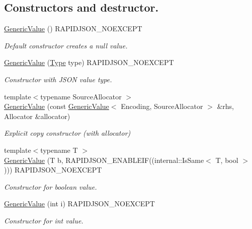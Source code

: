 \subsection*{Constructors and destructor.}
\begin{DoxyCompactItemize}
\item 
\hyperlink{classGenericValue_ab0205d57176d83814ea4e4598c596fe8}{Generic\+Value} () R\+A\+P\+I\+D\+J\+S\+O\+N\+\_\+\+N\+O\+E\+X\+C\+E\+PT
\begin{DoxyCompactList}\small\item\em Default constructor creates a null value. \end{DoxyCompactList}\item 
\hyperlink{classGenericValue_a83c8f84b8e61f2f40414b703b75aea61}{Generic\+Value} (\hyperlink{rapidjson_8h_a1d1cfd8ffb84e947f82999c682b666a7}{Type} type) R\+A\+P\+I\+D\+J\+S\+O\+N\+\_\+\+N\+O\+E\+X\+C\+E\+PT
\begin{DoxyCompactList}\small\item\em Constructor with J\+S\+ON value type. \end{DoxyCompactList}\item 
{\footnotesize template$<$typename Source\+Allocator $>$ }\\\hyperlink{classGenericValue_a5161c0c98ba9144c50a38acde28a5ede}{Generic\+Value} (const \hyperlink{classGenericValue}{Generic\+Value}$<$ Encoding, Source\+Allocator $>$ \&rhs, Allocator \&allocator)
\begin{DoxyCompactList}\small\item\em Explicit copy constructor (with allocator) \end{DoxyCompactList}\item 
{\footnotesize template$<$typename T $>$ }\\\hyperlink{classGenericValue_a88f02daf621c42b96d49d608fa9214de}{Generic\+Value} (T b, R\+A\+P\+I\+D\+J\+S\+O\+N\+\_\+\+E\+N\+A\+B\+L\+E\+IF((internal\+::\+Is\+Same$<$ T, bool $>$))) R\+A\+P\+I\+D\+J\+S\+O\+N\+\_\+\+N\+O\+E\+X\+C\+E\+PT
\begin{DoxyCompactList}\small\item\em Constructor for boolean value. \end{DoxyCompactList}\item 
\hyperlink{classGenericValue_aafc754ade38421c179f5c8933ecbaf45}{Generic\+Value} (int i) R\+A\+P\+I\+D\+J\+S\+O\+N\+\_\+\+N\+O\+E\+X\+C\+E\+PT
\begin{DoxyCompactList}\small\item\em Constructor for int value. \end{DoxyCompactList}\item 

\end{DoxyCompactItemize}
